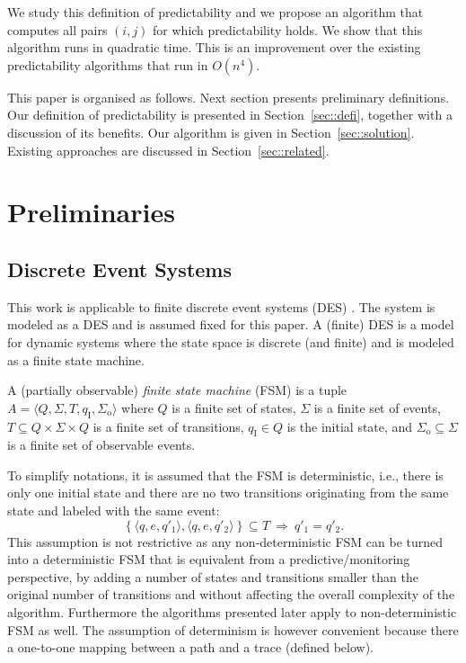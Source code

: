 \documentclass{article}
\newcommand{\qi}[0]{q_{\mathrm{I}}}
\newcommand{\sigmao}[0]{\Sigma_{\mathrm{o}}}
\begin{document}
We study this definition of predictability and 
we propose an algorithm that computes all pairs $(i,j)$ 
for which predictability holds.  
We show that this algorithm runs in quadratic time.  
This is an improvement over the existing predictability algorithms 
that run in $O(n^4)$.  

This paper is organised as follows.  
Next section presents preliminary definitions.  
Our definition of predictability is presented in Section~\ref{sec::defi}, 
together with a discussion of its benefits.  
Our algorithm is given in Section~\ref{sec::solution}.  
Existing approaches are discussed in Section~\ref{sec::related}.  

\section{Preliminaries}
\label{sec::prelim}
\subsection{Discrete Event Systems}

This work is applicable to finite discrete event systems (DES) 
\cite{cassandras-lafortune::99}.  
The system is modeled as a DES and is assumed fixed for this paper.  
A (finite) DES is a model for dynamic systems 
where the state space is discrete (and finite) 
and is modeled as a finite state machine.  


A (partially observable) \emph{finite state machine} (FSM) 
is a tuple $A = \langle Q,\Sigma,T,\qi,\sigmao\rangle$ 
where $Q$ is a finite set of states, 
$\Sigma$ is a finite set of events, 
$T \subseteq Q \times \Sigma \times Q$ is a finite set of transitions, 
$\qi \in Q$ is the initial state, 
and 
$\sigmao \subseteq \Sigma$ is a finite set of observable events.  

To simplify notations, it is assumed that the FSM is deterministic, 
i.e., there is only one initial state 
and there are no two transitions originating from the same state 
and labeled with the same event: 
\begin{displaymath}
  \left\{\langle q,e,q'_1\rangle,\langle q,e,q'_2\rangle\right\} 
  \subseteq T\ \Rightarrow\ q'_1 = q'_2.  
\end{displaymath}
This assumption is not restrictive 
as any non-deterministic FSM can be turned into a deterministic FSM 
that is equivalent from a predictive/monitoring perspective, 
by adding a number of states and transitions 
smaller than the original number of transitions 
and without affecting the overall complexity of the algorithm.  
Furthermore the algorithms presented later apply 
to non-deterministic FSM as well.  
The assumption of determinism is however convenient 
because there a one-to-one mapping between a path and a trace 
(defined below).  
\end{document}
